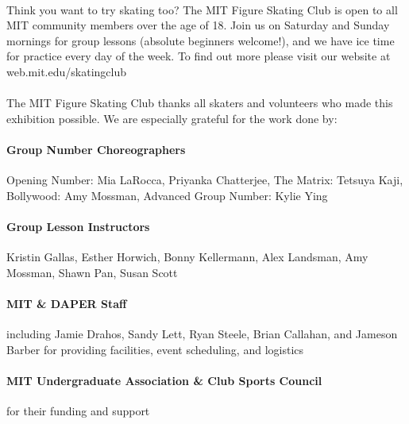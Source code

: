 \documentclass[12pt]{article}
\begin{document}
\begin{multicols*}{2}


\paragraph{} Think you want to try skating too? The MIT Figure Skating Club is open to all MIT community members over the age of 18. Join us on Saturday and Sunday mornings for group lessons (absolute beginners welcome!), and we have ice time for practice every day of the week. To find out more please visit our website at web.mit.edu/skatingclub

\paragraph{} The MIT Figure Skating Club thanks all skaters and volunteers who made this exhibition possible. We are especially grateful for the work done by:

\paragraph{Group Number Choreographers} Opening Number: Mia LaRocca, Priyanka Chatterjee, The Matrix: Tetsuya Kaji, Bollywood: Amy Mossman, Advanced Group Number: Kylie Ying

\paragraph{Group Lesson Instructors} Kristin Gallas, Esther Horwich, Bonny Kellermann, Alex Landsman, Amy Mossman, Shawn Pan, Susan Scott
\paragraph{MIT \& DAPER Staff} including Jamie Drahos, Sandy Lett, Ryan Steele, Brian Callahan, and Jameson Barber for providing facilities, event scheduling, and logistics
\paragraph{MIT Undergraduate Association \& Club Sports Council} for their funding and support

\vfill\null
\columnbreak


\begin{center}

\vspace*{1.5in}


\end{center}
\end{multicols*}
\end{document}
